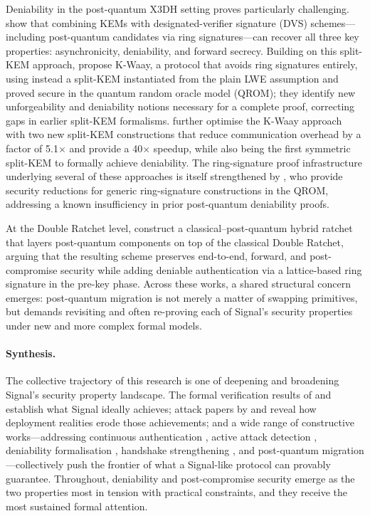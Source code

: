 Deniability in the post-quantum X3DH setting proves particularly challenging. \textcite{brendel2022} show that combining KEMs with designated-verifier signature (DVS) schemes—including post-quantum candidates via ring signatures—can recover all three key properties: asynchronicity, deniability, and forward secrecy. Building on this split-KEM approach, \textcite{collins2024b} propose K-Waay, a protocol that avoids ring signatures entirely, using instead a split-KEM instantiated from the plain LWE assumption and proved secure in the quantum random oracle model (QROM); they identify new unforgeability and deniability notions necessary for a complete proof, correcting gaps in earlier split-KEM formalisms. \textcite{niot2025} further optimise the K-Waay approach with two new split-KEM constructions that reduce communication overhead by a factor of 5.1$\times$ and provide a 40$\times$ speedup, while also being the first symmetric split-KEM to formally achieve deniability. The ring-signature proof infrastructure underlying several of these approaches is itself strengthened by \textcite{beckmann2026}, who provide security reductions for generic ring-signature constructions in the QROM, addressing a known insufficiency in prior post-quantum deniability proofs.

At the Double Ratchet level, \textcite{guo2025} construct a classical–post-quantum hybrid ratchet that layers post-quantum components on top of the classical Double Ratchet, arguing that the resulting scheme preserves end-to-end, forward, and post-compromise security while adding deniable authentication via a lattice-based ring signature in the pre-key phase. Across these works, a shared structural concern emerges: post-quantum migration is not merely a matter of swapping primitives, but demands revisiting and often re-proving each of Signal's security properties under new and more complex formal models.

\paragraph{Synthesis.}
The collective trajectory of this research is one of deepening and broadening Signal's security property landscape. The formal verification results of \textcite{cohn-gordon2020} and \textcite{bhargavan2021} establish what Signal ideally achieves; attack papers by \textcite{wichelmann2021} and \textcite{gegenhuber2025} reveal how deployment realities erode those achievements; and a wide range of constructive works—addressing continuous authentication \parencite{dowling2022}, active attack detection \parencite{barooti2023,teng2024}, deniability formalisation \parencite{vatandas2020,brendel2022,collins2024b,niot2025}, handshake strengthening \parencite{fiedler2025}, and post-quantum migration \parencite{hashimoto2021,hashimoto2022,sharma2023,guo2025}—collectively push the frontier of what a Signal-like protocol can provably guarantee. Throughout, deniability and post-compromise security emerge as the two properties most in tension with practical constraints, and they receive the most sustained formal attention.

